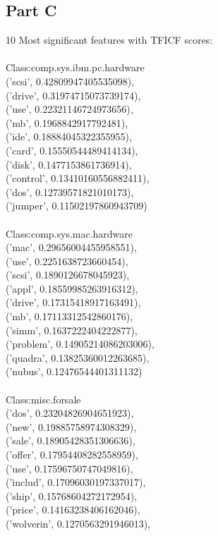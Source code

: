 \documentclass[11pt]{article}
\begin{document}
\subsection{Part C}
10 Most significant features with TFICF scores:\\
\\
Class:comp.sys.ibm.pc.hardware
\\
('scsi', 0.42809947405535098),\\ ('drive', 0.31974715073739174), \\ ('use', 0.22321146724973656), \\
('mb', 0.1968842917792481), \\
('ide', 0.18884045322355955),\\ ('card', 0.15550544489414134), \\ ('disk', 0.1477153861736914), \\ ('control', 0.13410160556882411),\\ ('dos', 0.12739571821010173),\\ ('jumper', 0.11502197860943709) \\ 
\\
Class:comp.sys.mac.hardware \\
('mac', 0.29656004455958551), \\ ('use', 0.2251638723660454),\\ ('scsi', 0.1890126678045923),\\ ('appl', 0.18559985263916312),\\ ('drive', 0.17315418917163491),\\ ('mb', 0.17113312542860176),\\ ('simm', 0.1637222404222877),\\ ('problem', 0.14905214086203006),\\ ('quadra', 0.13825360012263685),\\ ('nubus', 0.12476544401311132)\\
\\
Class:misc.forsale\\
('dos', 0.23204826904651923),\\ 
('new', 0.19885758974308329),\\ ('sale', 0.18905428351306636),\\ ('offer', 0.17954408282558959),\\ ('use', 0.17596750747049816),\\ ('includ', 0.17096030197337017),\\ ('ship', 0.15768604272172954),\\ ('price', 0.14163238406162046),\\ ('wolverin', 0.1270563291946013), \\ 
\end{document}

